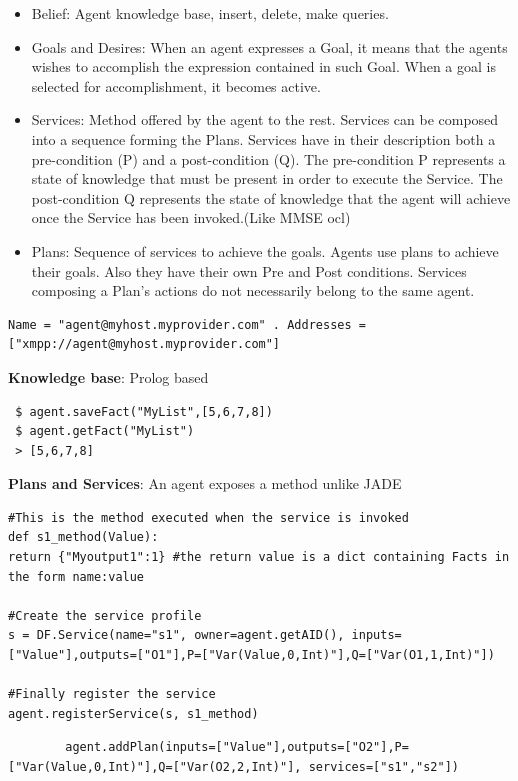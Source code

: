 \documentclass[a4paper, 11pt]{article}
\begin{document}
\begin{itemize}
	\item Belief: Agent knowledge base, insert, delete, make queries.
	\item Goals and Desires: When an agent expresses a Goal, it means that the agents wishes to accomplish the expression contained in such Goal. When a goal is selected for accomplishment, it becomes active.
	\item Services: Method offered by the agent to the rest. Services can be composed into a sequence forming the Plans. Services have in their description both a pre-condition (P) and a post-condition (Q). The pre-condition P represents a state of knowledge that must be present in order to execute the Service. The post-condition Q represents the state of knowledge that the agent will achieve once the Service has been invoked.(Like MMSE ocl)
	\item Plans: Sequence of services to achieve the goals. Agents use plans to achieve their goals. Also they have their own Pre and Post conditions. Services composing a Plan's actions do not necessarily belong to the same agent.
\end{itemize}

\begin{verbatim}
Name = "agent@myhost.myprovider.com" . Addresses = ["xmpp://agent@myhost.myprovider.com"]
\end{verbatim}

\textbf{Knowledge base}: Prolog based \\
\begin{verbatim}
 $ agent.saveFact("MyList",[5,6,7,8])
 $ agent.getFact("MyList")
 > [5,6,7,8]
\end{verbatim}

\textbf{Plans and Services}: An agent exposes a method unlike JADE \\
\begin{verbatim}
#This is the method executed when the service is invoked
def s1_method(Value):
return {"Myoutput1":1} #the return value is a dict containing Facts in the form name:value

#Create the service profile
s = DF.Service(name="s1", owner=agent.getAID(), inputs=["Value"],outputs=["O1"],P=["Var(Value,0,Int)"],Q=["Var(O1,1,Int)"])

#Finally register the service
agent.registerService(s, s1_method)
\end{verbatim}

\begin{verbatim}
        agent.addPlan(inputs=["Value"],outputs=["O2"],P=["Var(Value,0,Int)"],Q=["Var(O2,2,Int)"], services=["s1","s2"])
\end{verbatim}
\end{document}
